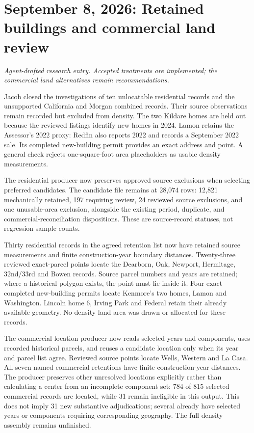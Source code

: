 \clearpage
\section*{September 8, 2026: Retained buildings and commercial land review}
\textit{Agent-drafted research entry. Accepted treatments are implemented; the commercial land alternatives remain recommendations.}

Jacob closed the investigations of ten unlocatable residential records and the unsupported California and Morgan combined records. Their source observations remain recorded but excluded from density. The two Kildare homes are held out because the reviewed listings identify new homes in 2024. Lamon retains the Assessor's 2022 proxy: Redfin also reports 2022 and records a September 2022 sale. Its completed new-building permit provides an exact address and point. A general check rejects one-square-foot area placeholders as usable density measurements.

The residential producer now preserves approved source exclusions when selecting preferred candidates. The candidate file remains at 28,074 rows: 12,821 mechanically retained, 197 requiring review, 24 reviewed source exclusions, and one unusable-area exclusion, alongside the existing period, duplicate, and commercial-reconciliation dispositions. These are source-record statuses, not regression sample counts.

Thirty residential records in the agreed retention list now have retained source measurements and finite construction-year boundary distances. Twenty-three reviewed exact-parcel points locate the Dearborn, Oak, Newport, Hermitage, 32nd/33rd and Bowen records. Source parcel numbers and years are retained; where a historical polygon exists, the point must lie inside it. Four exact completed new-building permits locate Kenmore's two homes, Lamon and Washington. Lincoln home 6, Irving Park and Federal retain their already available geometry. No density land area was drawn or allocated for these records.

The commercial location producer now reads selected years and components, uses recorded historical parcels, and reuses a candidate location only when its year and parcel list agree. Reviewed source points locate Wells, Western and La Casa. All seven named commercial retentions have finite construction-year distances. The producer preserves other unresolved locations explicitly rather than calculating a center from an incomplete component set: 784 of 815 selected commercial records are located, while 31 remain ineligible in this output. This does not imply 31 new substantive adjudications; several already have selected years or components requiring corresponding geography. The full density assembly remains unfinished.

